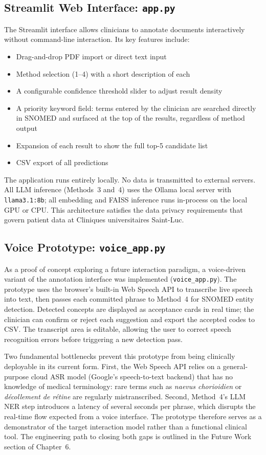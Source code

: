 \subsection{Streamlit Web Interface: \texttt{app.py}}

The Streamlit interface allows clinicians to annotate documents interactively without command-line interaction. Its key features include:

\begin{itemize}
    \item Drag-and-drop PDF import or direct text input
    \item Method selection (1--4) with a short description of each
    \item A configurable confidence threshold slider to adjust result density
    \item A priority keyword field: terms entered by the clinician are searched directly in SNOMED and surfaced at the top of the results, regardless of method output
    \item Expansion of each result to show the full top-5 candidate list
    \item CSV export of all predictions
\end{itemize}

The application runs entirely locally. No data is transmitted to external servers. All LLM inference (Methods~3 and~4) uses the Ollama local server with \texttt{llama3.1:8b}; all embedding and FAISS inference runs in-process on the local GPU or CPU. This architecture satisfies the data privacy requirements that govern patient data at Cliniques universitaires Saint-Luc.

\subsection{Voice Prototype: \texttt{voice\_app.py}}

As a proof of concept exploring a future interaction paradigm, a voice-driven variant of the annotation interface was implemented (\texttt{voice\_app.py}). The prototype uses the browser's built-in Web Speech API to transcribe live speech into text, then passes each committed phrase to Method~4 for SNOMED entity detection. Detected concepts are displayed as acceptance cards in real time; the clinician can confirm or reject each suggestion and export the accepted codes to CSV. The transcript area is editable, allowing the user to correct speech recognition errors before triggering a new detection pass.

Two fundamental bottlenecks prevent this prototype from being clinically deployable in its current form. First, the Web Speech API relies on a general-purpose cloud ASR model (Google's speech-to-text backend) that has no knowledge of medical terminology: rare terms such as \textit{naevus chorioidien} or \textit{décollement de rétine} are regularly mistranscribed. Second, Method~4's LLM NER step introduces a latency of several seconds per phrase, which disrupts the real-time flow expected from a voice interface. The prototype therefore serves as a demonstrator of the target interaction model rather than a functional clinical tool. The engineering path to closing both gaps is outlined in the Future Work section of Chapter~6.

